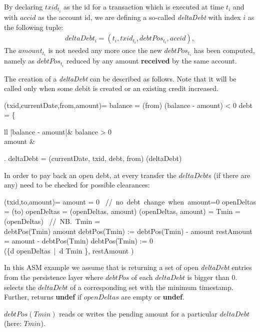 By declaring $txid_{t_i}$ as the id for a transaction which is executed at time $t_i$ and with $accid$ as the account id, we are defining a so-called \textit{deltaDebt} with index $i$ as the following tuple:
\begin{align}
	deltaDebt_i = (t_i, txid_{t_i}, debtPos_{t_i}, accid),
\end{align}
The $amount_{t_i}$ is not needed any more once the new $debtPos_{t_i}$ has been computed, namely as $debtPos_{t_i}$ reduced by any amount \textbf{received} by the same account.

The creation of a \textit{deltaDebt} can be described as follows. Note that it will be called only when some debit is created or an existing credit increased.

\begin{asm}
	(txid,currentDate,from,amount)=\+
		\LET balance = (from)\+
			\IF (balance - amount) < 0 \THEN\+
				\LET debt =  \+\left\{\begin{array}{ll}
						|balance - amount|\+& \IF balance > 0\\
						amount & \ELSE
					\end{array}\right.\-\-
				\LET deltaDebt = (currentDate, txid, debt, from)\+
					(deltaDebt)
\end{asm}

In order to pay back an open debt, at every transfer the $deltaDebt$s (if there are any) need to be checked for possible clearances:

\begin{asm}
	(txid,to,amount)=\+
	\IF amount \not = 0 \THEN \mbox{  // no debt change when }amount=0\+	    
		\LET openDeltas = (to)\+
			\IF openDeltas \not = \emptyset \THEN \+
			   (openDeltas, amount) \dec\dec\dec\-
	\WHERE \+
		(openDeltas, amount) =\+	
			\LET Tmin = (openDeltas) \mbox{  // NB. }Tmin \not = \UNDEF\\				\IF debtPos(Tmin) \ge amount \THEN\+
					debtPos(Tmin) := debtPos(Tmin) - amount\-
				\ELSE \+
					\LET restAmount = amount - debtPos(Tmin)\+
						debtPos(Tmin) := 0\\
						(\{d \in openDeltas\ |\ d \neq Tmin \}, restAmount )\dec\dec\dec\-
\end{asm}


In this ASM example we assume that  is returning a set of open \textit{deltaDebt} entries from the persistence layer where $debtPos$ of each $deltaDebt$ is bigger than $0$.  selects the $deltaDebt$ of a corresponding set with the minimum timestamp. Further,  returns \textbf{undef} if $openDeltas$ are empty or \textbf{undef}.

$debtPos(Tmin)$ reads or writes the pending amount for a particular $deltaDebt$ (here: $Tmin$).









